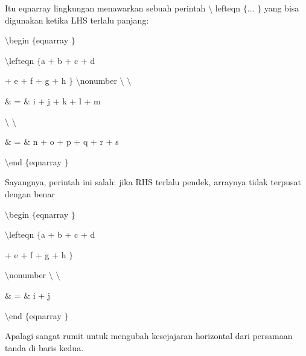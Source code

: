 \begin{itemize}
\vspace{12pt}
\noindent 
Itu eqnarray lingkungan menawarkan sebuah perintah  $  \setminus  $ lefteqn  $  \{  $... $  \}  $ yang bisa digunakan ketika LHS terlalu panjang: \par
\noindent 
\vspace{16pt}
\noindent 
 $  \setminus  $begin $  \{  $eqnarray $  \}  $ \par
\vspace{12pt}
\noindent 
 $  \setminus  $lefteqn $  \{  $a + b + c + d \par
\vspace{12pt}
\noindent 
+ e + f + g + h $  \}  $ $  \setminus  $nonumber $  \setminus  $ $  \setminus  $ \par
\vspace{12pt}
\noindent 
 $  \&  $ =  $  \&  $ i + j + k + l + m \par
\vspace{12pt}
\noindent 
 $  \setminus  $ $  \setminus  $ \par
\vspace{12pt}
\noindent 
 $  \&  $ =  $  \&  $ n + o + p + q + r + s \par
\vspace{12pt}
\noindent 
 $  \setminus  $end $  \{  $eqnarray $  \}  $ \par
\noindent 
\vspace{16pt}
\noindent 
Sayangnya, perintah ini salah: jika RHS terlalu pendek, arraynya tidak terpusat dengan benar \par
\noindent 
\vspace{16pt}
\noindent 
 $  \setminus  $begin $  \{  $eqnarray $  \}  $ \par
\vspace{12pt}
\noindent 
 $  \setminus  $lefteqn $  \{  $a + b + c + d \par
\vspace{12pt}
\noindent 
+ e + f + g + h $  \}  $ \par
\vspace{12pt}
\noindent 
 $  \setminus  $nonumber $  \setminus  $ $  \setminus  $ \par
\vspace{12pt}
\noindent 
 $  \&  $ =  $  \&  $ i + j \par
\vspace{12pt}
\noindent 
 $  \setminus  $end $  \{  $eqnarray $  \}  $ \par
\vspace{12pt}
\noindent 
Apalagi sangat rumit untuk mengubah kesejajaran horizontal dari persamaan tanda di baris kedua.  \par

\end{itemize}
